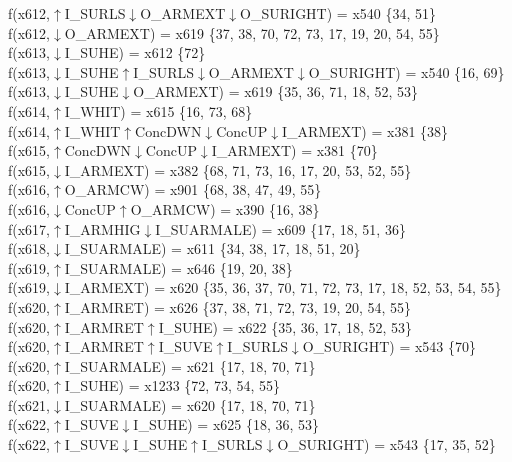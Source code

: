 f(x612,$\uparrow$I\_SURLS$\downarrow$O\_ARMEXT$\downarrow$O\_SURIGHT) = x540 \{34, 51\} \\  
f(x612,$\downarrow$O\_ARMEXT) = x619 \{37, 38, 70, 72, 73, 17, 19, 20, 54, 55\} \\  
f(x613,$\downarrow$I\_SUHE) = x612 \{72\} \\  
f(x613,$\downarrow$I\_SUHE$\uparrow$I\_SURLS$\downarrow$O\_ARMEXT$\downarrow$O\_SURIGHT) = x540 \{16, 69\} \\  
f(x613,$\downarrow$I\_SUHE$\downarrow$O\_ARMEXT) = x619 \{35, 36, 71, 18, 52, 53\} \\  
f(x614,$\uparrow$I\_WHIT) = x615 \{16, 73, 68\} \\  
f(x614,$\uparrow$I\_WHIT$\uparrow$ConcDWN$\downarrow$ConcUP$\downarrow$I\_ARMEXT) = x381 \{38\} \\  
f(x615,$\uparrow$ConcDWN$\downarrow$ConcUP$\downarrow$I\_ARMEXT) = x381 \{70\} \\  
f(x615,$\downarrow$I\_ARMEXT) = x382 \{68, 71, 73, 16, 17, 20, 53, 52, 55\} \\  
f(x616,$\uparrow$O\_ARMCW) = x901 \{68, 38, 47, 49, 55\} \\  
f(x616,$\downarrow$ConcUP$\uparrow$O\_ARMCW) = x390 \{16, 38\} \\  
f(x617,$\uparrow$I\_ARMHIG$\downarrow$I\_SUARMALE) = x609 \{17, 18, 51, 36\} \\  
f(x618,$\downarrow$I\_SUARMALE) = x611 \{34, 38, 17, 18, 51, 20\} \\  
f(x619,$\uparrow$I\_SUARMALE) = x646 \{19, 20, 38\} \\  
f(x619,$\downarrow$I\_ARMEXT) = x620 \{35, 36, 37, 70, 71, 72, 73, 17, 18, 52, 53, 54, 55\} \\  
f(x620,$\uparrow$I\_ARMRET) = x626 \{37, 38, 71, 72, 73, 19, 20, 54, 55\} \\  
f(x620,$\uparrow$I\_ARMRET$\uparrow$I\_SUHE) = x622 \{35, 36, 17, 18, 52, 53\} \\  
f(x620,$\uparrow$I\_ARMRET$\uparrow$I\_SUVE$\uparrow$I\_SURLS$\downarrow$O\_SURIGHT) = x543 \{70\} \\  
f(x620,$\uparrow$I\_SUARMALE) = x621 \{17, 18, 70, 71\} \\  
f(x620,$\uparrow$I\_SUHE) = x1233 \{72, 73, 54, 55\} \\  
f(x621,$\downarrow$I\_SUARMALE) = x620 \{17, 18, 70, 71\} \\  
f(x622,$\uparrow$I\_SUVE$\downarrow$I\_SUHE) = x625 \{18, 36, 53\} \\  
f(x622,$\uparrow$I\_SUVE$\downarrow$I\_SUHE$\uparrow$I\_SURLS$\downarrow$O\_SURIGHT) = x543 \{17, 35, 52\} \\  
